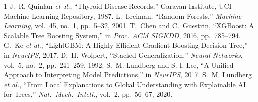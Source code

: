 \documentclass[conference]{IEEEtran}
\begin{document}
\begin{thebibliography}{1}
J.~R. Quinlan \emph{et al.}, ``Thyroid Disease Records,'' Garavan Institute, UCI
Machine Learning Repository, 1987.
L.~Breiman, ``Random Forests,'' \emph{Machine Learning}, vol.~45, no.~1,
pp.~5--32, 2001.
T.~Chen and C.~Guestrin, ``XGBoost: A Scalable Tree Boosting System,'' in
\emph{Proc.\ ACM SIGKDD}, 2016, pp.~785--794.
G.~Ke \emph{et al.}, ``LightGBM: A Highly Efficient Gradient Boosting Decision
Tree,'' in \emph{NeurIPS}, 2017.
D.~H. Wolpert, ``Stacked Generalization,'' \emph{Neural Networks}, vol.~5, no.~2,
pp.~241--259, 1992.
S.~M. Lundberg and S.-I. Lee, ``A Unified Approach to Interpreting Model
Predictions,'' in \emph{NeurIPS}, 2017.
S.~M. Lundberg \emph{et al.}, ``From Local Explanations to Global Understanding
with Explainable AI for Trees,'' \emph{Nat.\ Mach.\ Intell.}, vol.~2, pp.~56--67,
2020.
\end{thebibliography}
\end{document}
